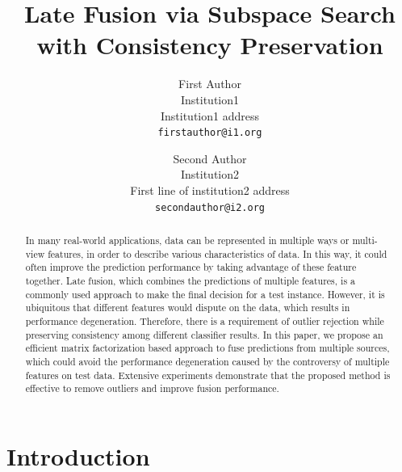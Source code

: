 \documentclass[10pt,twocolumn,letterpaper]{article}
\begin{document}
\title{Late Fusion via Subspace Search with Consistency Preservation}

\author{First Author\\
Institution1\\
Institution1 address\\
{\tt\small firstauthor@i1.org}
\and
Second Author\\
Institution2\\
First line of institution2 address\\
{\tt\small secondauthor@i2.org}
}

\maketitle


\begin{abstract}
In many real-world applications, data can be represented in multiple ways or multi-view features,
in order to describe various characteristics of data.
In this way, it could often improve the prediction performance by taking advantage of these feature together.
Late fusion, which combines the predictions of multiple features, is a commonly used approach to make the final decision for a test instance.
However, it is ubiquitous that different features would dispute on the data, which results in performance degeneration.
Therefore, there is a requirement of outlier rejection while preserving consistency among different classifier results.
In this paper, we propose an efficient matrix factorization based approach to fuse predictions from multiple sources,
which could avoid the performance degeneration caused by the controversy of multiple features on test data.
Extensive experiments demonstrate that the proposed method is effective to remove outliers and improve fusion performance.

\end{abstract}

\section{Introduction}
\end{document}
